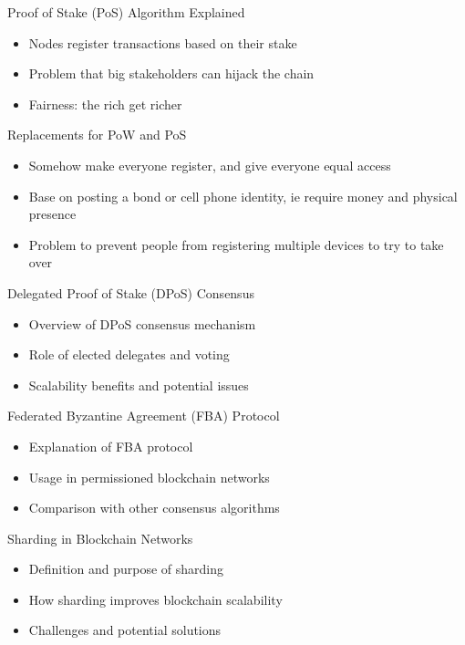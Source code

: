 \begin{withoutheadline}
\begin{frame}{Proof of Stake (PoS) Algorithm Explained}
    \begin{itemize}
        \item Nodes register transactions based on their stake
        \item Problem that big stakeholders can hijack the chain
        \item Fairness: the rich get richer
    \end{itemize}
\end{frame}

\begin{frame}{Replacements for PoW and PoS}
    \begin{itemize}
        \item Somehow make everyone register, and give everyone equal access
        \item Base on posting a bond or cell phone identity, ie require money and physical presence
        \item Problem to prevent people from registering multiple devices to try to take over
    \end{itemize}
\end{frame}

\begin{frame}{Delegated Proof of Stake (DPoS) Consensus}
    \begin{itemize}
        \item Overview of DPoS consensus mechanism
        \item Role of elected delegates and voting
        \item Scalability benefits and potential issues
    \end{itemize}
\end{frame}

\begin{frame}{Federated Byzantine Agreement (FBA) Protocol}
    \begin{itemize}
        \item Explanation of FBA protocol
        \item Usage in permissioned blockchain networks
        \item Comparison with other consensus algorithms
    \end{itemize}
\end{frame}

\begin{frame}{Sharding in Blockchain Networks}
    \begin{itemize}
        \item Definition and purpose of sharding
        \item How sharding improves blockchain scalability
        \item Challenges and potential solutions
    \end{itemize}
\end{frame}


\end{withoutheadline}
